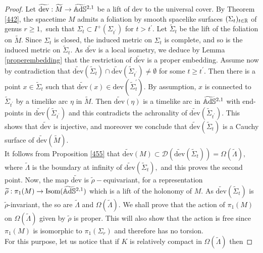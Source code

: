 \begin{proof}
    Let $\widetilde{\text{dev}}:\widetilde{M}\to\widetilde{\mathbb{A}\mathrm{d}\mathbb{S}}{}^{2,1}$ be a lift of dev to the universal cover. By Theorem \ref{442}, the spacetime $M$ admits a foliation by smooth spacelike surfaces $(\Sigma_t)_{t\in\mathbb{R}}$ of genus $r\geq 1,$ such that $\Sigma_t\subset I^+(\Sigma_{t^{\prime}})$ for $t>t^{\prime}$. Let $\widetilde{\Sigma}_t$ be the lift of the foliation on $\widetilde{M}$. Since $\Sigma_t$ is closed, the induced metric on $\Sigma_t$ is complete, and so is the induced metric on $\widetilde{\Sigma}_t$. As $\widetilde{\text{dev}}$ is a local isometry, we deduce by Lemma \ref{properembedding} that the restriction of $\widetilde{\text{dev}}$ is a proper embedding. Assume now by contradiction that $\widetilde{\text{dev}}(\widetilde{\Sigma}_t)\cap \widetilde{\text{dev}}(\widetilde{\Sigma}_{t^{\prime}})\neq \emptyset$ for some $t\geq t^{\prime}.$ Then there is a point $x\in \widetilde{\Sigma}_t$ such that $\widetilde{\text{dev}}(x)\in\text{dev}(\widetilde{\Sigma}_t^{\prime}).$ By assumption, $x$ is connected to $\widetilde{\Sigma}_{t^{\prime} }$ by a timelike arc $\eta$ in $\widetilde{M}.$ Then $\widetilde{\text{dev}}(\eta)$ is a timelike arc in $\widetilde{\mathbb{A}\mathrm{d}\mathbb{S}}{}^{2,1}$ with end-points in $\widetilde{\text{dev}}(\widetilde{\Sigma}_{t^{\prime}})$ and this contradicts the achronality of $\widetilde{\text{dev}}(\widetilde{\Sigma}_{t^{\prime} }).$ This shows that $\widetilde{\text{dev}}$ is injective, and moreover we conclude that $\widetilde{\text{dev}}(\widetilde{\Sigma}_t)$ is a Cauchy surface of $\widetilde{\text{dev}}(\widetilde{M})$.\\
    It follows from Proposition \ref{455} that $\widetilde{\text{dev}}(M)\subset \mathcal{D}(\widetilde{\text{dev}}(\widetilde{\Sigma}_t))=\Omega(\widetilde{\Lambda}),$ where $\widetilde{\Lambda}$ is the boundary at infinity of $\widetilde{\text{dev}}(\widetilde{\Sigma}_t),$ and this proves the second point.       
    Now, the map $\widetilde{\text{dev}}$ is $\widetilde{\rho}-$equivariant, for a representation $\widetilde{\rho}:\pi_1(M)\to\text{Isom}(\widetilde{\mathbb{A}\mathrm{d}\mathbb{S}}{}^{2,1})$ which is a lift of the holonomy of $M$. As $\widetilde{\text{dev}}(\widetilde{\Sigma}_t)$ is $\widetilde{\rho}$-invariant, the so are $\widetilde{\Lambda}$ and $\Omega(\widetilde{\Lambda})$. We shall prove that the action of $\pi_1(M)$ on $\Omega(\widetilde{\Lambda})$ given by $\widetilde{\rho}$ is proper. This will also show that the action is free since $\pi_1(M)$ is isomorphic to $\pi_1(\Sigma_r)$ and therefore has no torsion. \\
    For this purpose, let us notice that if $K$ is relatively compact in $\Omega(\widetilde{\Lambda})$ then 

\end{proof}
